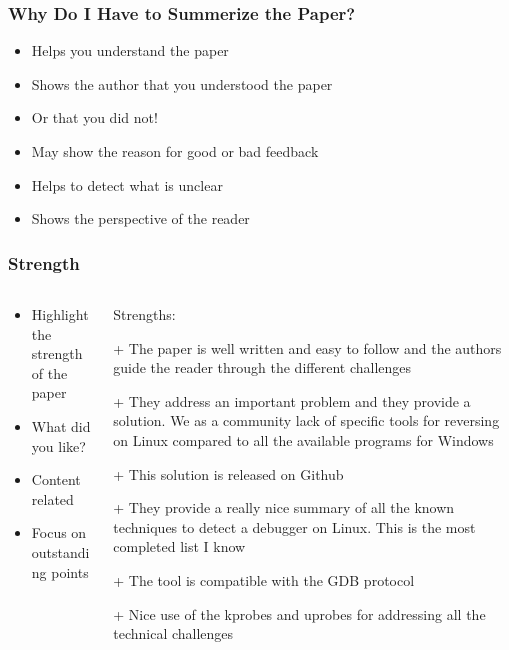 \documentclass[xcolor={usenames,dvipsnames}]{beamer}
\begin{document}
\begin{frame}
	\frametitle{Why Do I Have to Summerize the Paper?}

	\begin{itemize}
		\item Helps you understand the paper
		\item Shows the author that you understood the paper
		\item \alert{Or that you did not!}
		\item May show the reason for good or bad feedback
		\item Helps to detect what is unclear
		\item Shows the perspective of the reader
	\end{itemize}
\end{frame}

\begin{frame}
	\frametitle{Strength}

	\begin{columns}
		\begin{column}{0.5\linewidth}
			\begin{itemize}
				\item Highlight the strength of the paper
				\item What did you like?
				\item Content related
				\item Focus on outstanding points
			\end{itemize}
		\end{column}
		\begin{column}{0.49\linewidth}
			\tiny
			Strengths:

			+ The paper is well written and easy to follow and the authors guide the
			reader through the different challenges

			+ They address an important problem and they provide a solution. We as a
			community lack of specific tools for reversing on Linux compared to all
			the available programs for Windows

			+ This solution is released on Github

			+ They provide a really nice summary of all the known techniques to
			detect a debugger on Linux. This is the most completed list I know

			+ The tool is compatible with the GDB protocol

			+ Nice use of the kprobes and uprobes for addressing all the technical
			challenges

		\end{column}
	\end{columns}
\end{frame}
\end{document}
